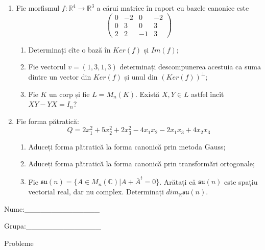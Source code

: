 \documentclass{article}
\begin{document}
\begin{enumerate}
 \item Fie morfismul $f:\mathbb{R}^4 \to \mathbb{R}^3$ a cărui matrice în raport cu bazele canonice este
$$\begin{pmatrix}
0&-2&0&-2\\
0&3&0&3\\
2&2&-1&3
\end{pmatrix}$$

\begin{enumerate}
\item Determinați cîte o bază în $Ker(f)$ și $Im(f)$;
\item Fie vectorul $v=(1,3,1,3)$ determinați descompunerea acestuia ca suma dintre un vector din $Ker(f)$ și unul din $(Ker(f))^\perp$;
\item Fie $K$ un corp și fie $L=M_n(K)$. Există $X,Y \in L$ astfel încît $XY-YX=I_n$?  
\end{enumerate}
\item Fie forma pătratică:
$$Q= 2x_1^2+5x_2^2+2x_3^2-4x_1x_2-2x_1x_3+4x_2x_3$$

\begin{enumerate}
\item Aduceți forma pătratică la forma canonică prin metoda Gauss;
\item Aduceți forma pătratică la forma canonică prin transformări ortogonale;
\item Fie $\mathfrak{su}(n)=\{ A \in M_n(\mathbb{C}) | A+\bar{A}^t=0\}$. Arătați că $\mathfrak{su}(n)$ este spațiu vectorial real, dar nu complex.
Determinați $dim_{\mathbb{R}}\mathfrak{su}(n)$.
\end{enumerate}
\end{enumerate}
\newpage
\begin{flushright}
Nume:\_\_\_\_\_\_\_\_\_\_\_\_\_\_
 
 
Grupa:\_\_\_\_\_\_\_\_\_\_\_\_\_\_
\end{flushright}
\begin{center}
\vspace{2cm}
{\Large Probleme}
\vspace{2cm}
\end{center}
\end{document}
